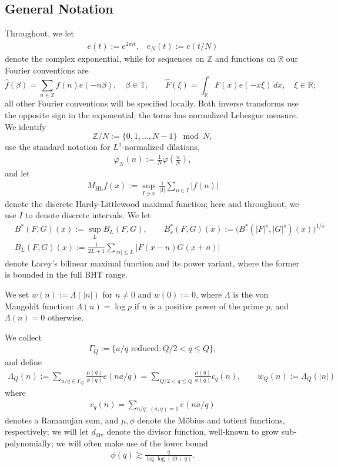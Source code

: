 \documentclass[12pt,leqno]{amsart}
\numberwithin{equation}{section}
\theoremstyle{definition}
\theoremstyle{plain}
\begin{document}
	\subsection{General Notation}
	Throughout, we let
	\begin{align}
		e(t) := e^{2 \pi i t}, \; \; \; e_N(t) := e(t/N)
	\end{align}
	denote the complex exponential, while for sequences on $\mathbb Z$ and
	functions on $\mathbb R$ our Fourier conventions are
	\[
	\widehat f(\beta)=\sum_{n\in\mathbb Z}f(n)e(-n\beta),\quad\beta\in\mathbb T,
	\qquad
	\widehat F(\xi)=\int_{\mathbb R}F(x)e(-x\xi)\,dx, \quad \xi \in \mathbb{R};
	\]
	all other Fourier conventions will be specified locally.
	Both inverse transforms use the opposite sign in the exponential;
	the torus has normalized Lebesgue measure. We %
	identify 
	\[ \mathbb{Z}/N := \{ 0,1,\dots, N-1\} \mod N,\]
	use the standard notation for $L^1$-normalized dilations,
	\begin{align}
		\varphi_N(n) := \frac{1}{N} \varphi(\frac{n}{N}),
	\end{align}
	and let
	\begin{align}
		M_{\text{HL}} f(x):=  \sup_{I \ni x} \, \frac{1}{|I|} \sum_{n \in I} |f(n)|  
	\end{align}
	denote the discrete Hardy-Littlewood maximal function; here and throughout, we use $I$ to denote discrete intervals. We let
	\begin{align}\label{e:bimax}
		&B^*(F,G)(x) := \sup_L B_L(F,G), \qquad B_s^*(F,G)(x) := \big(B^*(|F|^s,|G|^s)(x)\big)^{1/s} \\ & B_L(F,G)(x):=\frac{1}{2L+1}\sum_{|n|\leq L}|F(x-n)G(x+n)|
	\end{align}
	denote Lacey's bilinear maximal function and its power variant, where the former is bounded in the full BHT range.
	
	We set $w(n) := \Lambda(|n|)$ for $n\ne0$ and $w(0):=0$, where $\Lambda$ is the von Mangoldt function:
	$\Lambda(n)=\log p$ if $n$ is a positive power of the prime $p$, and $\Lambda(n)=0$ otherwise.
	
	We collect
	\begin{align}\label{e:GammaQ}
		\Gamma_Q := \{ a/q \text{ reduced} : Q/2 < q \leq Q \},
	\end{align}
	and define
	\begin{align}\label{e:WQ}
		\Lambda_Q(n) := \sum_{a/q \in \Gamma_Q} \frac{\mu(q)}{\phi(q)} e(na/q ) = \sum_{Q/2 < q \leq Q} \frac{\mu(q)}{\phi(q)} c_q(n), \qquad w_Q(n) := \Lambda_Q(|n|)
	\end{align}
	where
	\begin{align}\label{e:ram}
		c_q(n) = \sum_{a/q : \ (a,q) =1} e(na/q )
	\end{align}
	denotes a Ramanujan sum, and $\mu,\phi$ denote the M\"{o}bius and totient functions, respectively; we will let $d_{\text{div}}$ denote the divisor function, well-known to grow sub-polynomially; we will often make use of the lower bound
	\begin{align}\label{e:totientbound}
		\phi(q) \gtrsim \frac{q}{\log \log (10 + q)}.
	\end{align}
	
\end{document}
